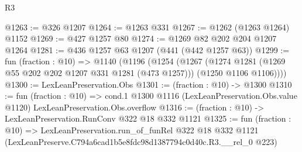 \begin{lexlean}{R3}
\begin{coremodule}
@1263 := @326 @1207
@1264 := @1263 @331
@1267 := @1262 (@1263 @1264) @1152
@1269 := @427 @1257 @80
@1274 := @1269 @82 @202 @204 @1207 @1264
@1281 := @436 @1257 @63 @1207 (@441 (@442 @1257 @63))
@1299 := fun (fraction : @10) =>
  @1140
    (@1196
      (@1254
        (@1267
          (@1274 @1281 (@1269 @55 @202 @202 @1207 @331 @1281 (@473 @1257)))
          (@1250 @1106 @1106))))
@1300 := LexLeanPreservation.Obs
@1301 := (fraction : @10) -> @1300
@1310 := fun (fraction : @10) =>
  cond.{1} @1300 @1116 (LexLeanPreservation.Obs.value @1120) LexLeanPreservation.Obs.overflow
@1316 := (fraction : @10) -> LexLeanPreservation.RunConv @322 @18 @332 @1121
@1325 := fun (fraction : @10) =>
  LexLeanPreservation.run_of_funRel
    @322
    @18
    @332
    @1121
    (LexLeanPreserve.C794a6cad1b5e8fdc98d1387794c0d40c.R3.__rel_0 @223)
\end{coremodule}
\end{lexlean}
